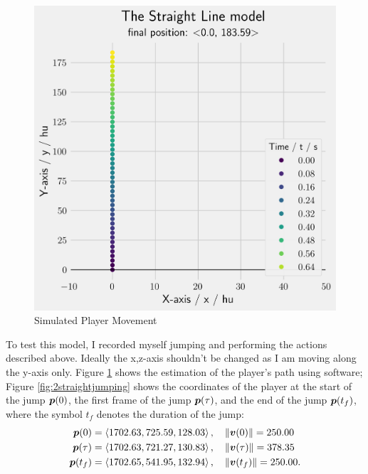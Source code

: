\begin{figure}[H]
\begin{minipage}{.5\textwidth}
        \includegraphics[width=0.9\linewidth]{assets/straight_constraint.png}
        \caption{Simulated Player Movement}
        \label{fig:straight_constraint}
    \end{minipage}
\end{figure}

To test this model, I recorded myself jumping and performing the actions described above. Ideally the x,z-axis shouldn't be changed as I am moving along the y-axis only. Figure \ref{fig:straight_constraint} shows the estimation of the player's path using software; Figure \ref{fig:2straightjumping} shows the coordinates of the player at the start of the jump $\boldsymbol{p}(0)$, the first frame of the jump $\boldsymbol{p}(\tau)$, and the end of the jump $\boldsymbol{p}(t_f)$, where the symbol $t_f$ denotes the duration of the jump:
\begin{align}
 \boldsymbol{p}(0) &= \left\langle 1702.63, 725.59, 128.03 \right\rangle, \quad \|\boldsymbol{v}(0)\| = 250.00 \label{eq:2emp0}\\
 \boldsymbol{p}(\tau) &= \left\langle 1702.63, 721.27, 130.83 \right\rangle, \quad \|\boldsymbol{v}(\tau)\| = 378.35 \label{eq:2emp1}\\
 \boldsymbol{p}(t_f) &= \left\langle 1702.65,541.95, 132.94 \right\rangle, \quad \|\boldsymbol{v}(t_f)\| = 250.00 \label{eq:2emp2}.
\end{align}

